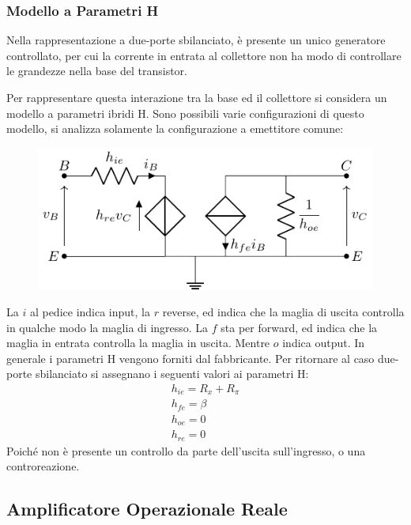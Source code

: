 \documentclass{article}
\numberwithin{equation}{subsection}
\begin{document}
\subsubsection{Modello a Parametri H}

Nella rappresentazione a due-porte sbilanciato, è presente un unico generatore controllato, per cui la corrente in entrata al collettore non ha modo di 
controllare le grandezze nella base del transistor. 

Per rappresentare questa interazione tra la base ed il collettore si considera un modello a parametri ibridi H. 
Sono possibili varie configurazioni di questo modello, si analizza solamente la configurazione a emettitore comune:
\begin{figure}[H]%
    \centering
    \includegraphics{bjt-parametri-h.pdf}%
    \label{fig:bjt-parametri-h}
\end{figure}
La $i$ al pedice indica input, la $r$ reverse, ed indica che la maglia di uscita controlla in qualche modo la maglia di ingresso. La $f$ sta 
per forward, ed indica che la maglia in entrata controlla la maglia in uscita. Mentre $o$ indica output. 
In generale i parametri H vengono forniti dal fabbricante. 
Per ritornare al caso due-porte sbilanciato si assegnano i seguenti valori ai parametri H:
\begin{gather*}
    h_{ie}=R_x+R_{\pi}\\
    h_{fe}=\beta\\
    h_{oe}=0\\
    h_{re}=0
\end{gather*}
Poiché non è presente un controllo da parte dell'uscita sull'ingresso, o una controreazione. 

\subsection{Amplificatore Operazionale Reale}
\end{document}
